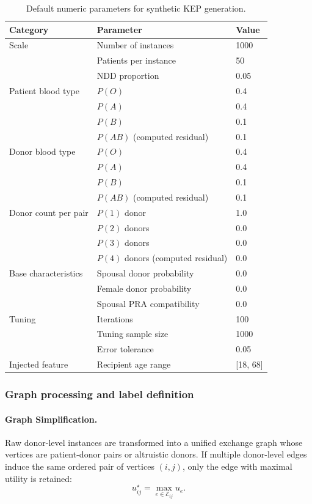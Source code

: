 \documentclass{article}
\begin{document}
\begin{table}[H]
\centering
\caption{Default numeric parameters for synthetic KEP generation.}
\label{tab:generation-params}
\begin{tabular}{|l|l|l|}
\hline
\textbf{Category} & \textbf{Parameter} & \textbf{Value} \\
\hline
Scale & Number of instances & 1000 \\
 & Patients per instance & 50 \\
 & NDD proportion & 0.05 \\
\hline
Patient blood type & \(P(O)\) & 0.4 \\
 & \(P(A)\) & 0.4 \\
 & \(P(B)\) & 0.1 \\
 & \(P(AB)\) (computed residual) & 0.1 \\
\hline
Donor blood type & \(P(O)\) & 0.4 \\
 & \(P(A)\) & 0.4 \\
 & \(P(B)\) & 0.1 \\
 & \(P(AB)\) (computed residual) & 0.1 \\
\hline
Donor count per pair & \(P(1)\) donor & 1.0 \\
 & \(P(2)\) donors & 0.0 \\
 & \(P(3)\) donors & 0.0 \\
 & \(P(4)\) donors (computed residual) & 0.0 \\
\hline
Base characteristics & Spousal donor probability & 0.0 \\
 & Female donor probability & 0.0 \\
 & Spousal PRA compatibility & 0.0 \\
\hline
Tuning & Iterations & 100 \\
 & Tuning sample size & 1000 \\
 & Error tolerance & 0.05 \\
\hline
Injected feature & Recipient age range & [18, 68] \\
\hline
\end{tabular}
\end{table}

\subsubsection{Graph processing and label definition}\label{subsubsec:graph-processing}
\paragraph{Graph Simplification.}
Raw donor-level instances are transformed into a unified exchange graph whose vertices are patient-donor pairs or altruistic donors. If multiple donor-level edges induce the same ordered pair of vertices $(i,j)$, only the edge with maximal utility is retained:
\[
u_{ij}^{\star}=\max_{e\in\mathcal{E}_{ij}} u_e .
\]
\end{document}
